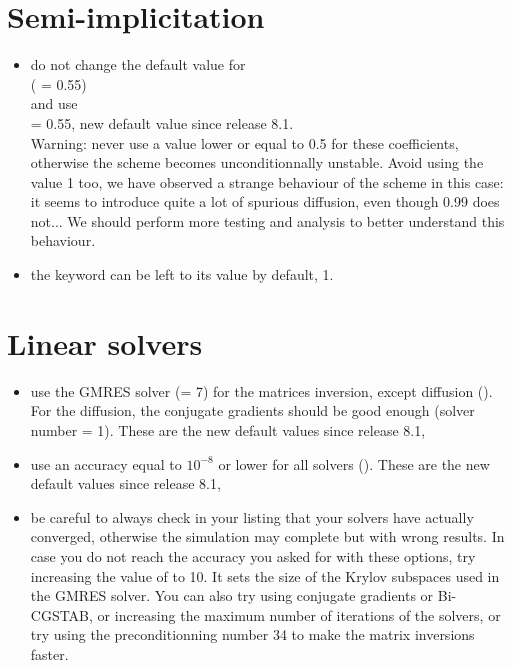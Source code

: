 \section{Semi-implicitation}
\begin{itemize}
\item do not change the default value for\\
   ( = 0.55)\\
  and use \\
   = 0.55, new default value since release 8.1. \\
Warning: never use a value lower or equal to 0.5 for these coefficients,
otherwise the scheme becomes unconditionnally unstable. Avoid using the value 1 too, we have observed a
strange behaviour of the scheme in this case: it seems to introduce quite a lot of spurious diffusion,
even though 0.99 does not... We should perform more testing and analysis to better understand this behaviour.
\item the keyword  can be left to its value by default, 1.
\end{itemize}

\section{Linear solvers}
\begin{itemize}
\item use the GMRES solver (= 7) for the matrices inversion, except diffusion
().
For the diffusion, the conjugate gradients should be good enough (solver number = 1).
These are the new default values since release 8.1,
\item use an accuracy equal to $10^{-8}$ or lower for all solvers
().
These are the new default values since release 8.1,
\item be careful to always check in your listing that your solvers have actually converged,
otherwise the simulation may complete but with wrong results.
In case you do not reach the accuracy you asked for with these options,
try increasing the value of  to 10.
It sets the size of the Krylov subspaces used in the GMRES solver.
You can also try using conjugate gradients or Bi-CGSTAB,
or increasing the maximum number of iterations of the solvers,
or try using the preconditionning number 34 to make the matrix inversions faster.
\end{itemize}

